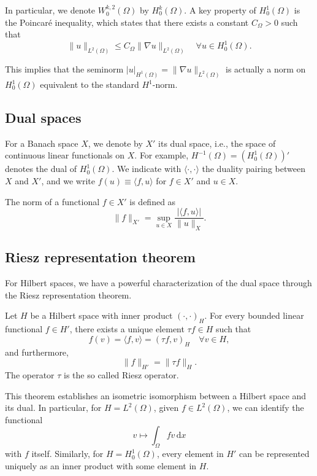 In particular, we denote $W_0^{k,2}(\Omega)$ by $H_0^k(\Omega)$. A key property of $H_0^1(\Omega)$ is the Poincaré inequality, which states that there exists a constant $C_{\Omega} > 0$ such that
\[
\|u\|_{L^2(\Omega)} \leq C_{\Omega} \|\nabla u\|_{L^2(\Omega)} \quad \forall u \in H_0^1(\Omega).
\]

This implies that the seminorm $|u|_{H^1(\Omega)} = \|\nabla u\|_{L^2(\Omega)}$ is actually a norm on $H_0^1(\Omega)$ equivalent to the standard $H^1$-norm.

\subsection{Dual spaces}

For a Banach space $X$, we denote by $X'$ its dual space, i.e., the space of continuous linear functionals on $X$. For example, $H^{-1}(\Omega) = (H_0^1(\Omega))'$ denotes the dual of $H_0^1(\Omega)$. We indicate with $\langle \cdot, \cdot \rangle$ the duality pairing between $X$ and $X'$, and we write $f(u) \equiv \langle f, u \rangle$ for $f \in X'$ and $u \in X$.

The norm of a functional $f \in X'$ is defined as
\[
\|f\|_{X'} = \sup_{u \in X} \frac{|\langle f, u \rangle|}{\|u\|_X}.
\]

\subsection{Riesz representation theorem}

For Hilbert spaces, we have a powerful characterization of the dual space through the Riesz representation theorem.

\begin{theorem}
  \label{theo:riesz_representation}
Let $H$ be a Hilbert space with inner product $(\cdot, \cdot)_H$. For every bounded linear functional $f \in H'$, there exists a unique element $\tau f \in H$ such that
\[
f(v) = \langle f, v \rangle = (\tau f, v)_H \quad \forall v \in H,
\]
and furthermore,
\[
\|f\|_{H'} = \|\tau f\|_H.
\]
The operator $\tau$ is the so called Riesz operator.
\end{theorem}

This theorem establishes an isometric isomorphism between a Hilbert space and its dual. In particular, for $H = L^2(\Omega)$, given $f \in L^2(\Omega)$, we can identify the functional 
\[
v \mapsto \int_\Omega f v \, \mathrm{d}x
\]
with $f$ itself. Similarly, for $H = H^1_0(\Omega)$, every element in $H'$ can be represented uniquely as an inner product with some element in $H$.

